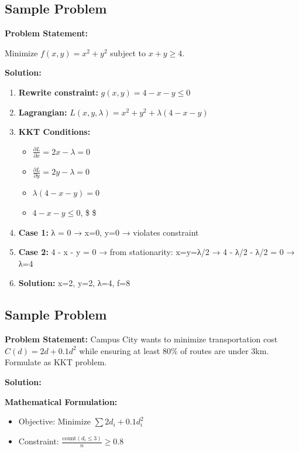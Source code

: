 \documentclass[
  letterpaper,
  DIV=11,
  numbers=noendperiod]{scrreprt}
\providecommand{\tightlist}{%
  \setlength{\itemsep}{0pt}\setlength{\parskip}{0pt}}
\begin{document}
\subsection{Sample Problem}\label{sample-problem-4}

\textbf{Problem Statement:}

Minimize \(f(x,y) = x^2 + y^2\) subject to \(x + y \geq 4\).

\textbf{Solution:}

\begin{enumerate}
\def\labelenumi{\arabic{enumi}.}
\tightlist
\item
  \textbf{Rewrite constraint:} \(g(x,y) = 4 - x - y \leq 0\)
\item
  \textbf{Lagrangian:}
  \(L(x,y,\lambda) = x^2 + y^2 + \lambda(4 - x - y)\)
\item
  \textbf{KKT Conditions:}

  \begin{itemize}
  \tightlist
  \item
    \(\frac{\partial L}{\partial x} = 2x - \lambda = 0\)
  \item
    \(\frac{\partial L}{\partial y} = 2y - \lambda = 0\)
  \item
    \(\lambda(4 - x - y) = 0\)
  \item
    \(4 - x - y \leq 0\), \$\lambda {} \$
  \end{itemize}
\item
  \textbf{Case 1:} λ = 0 → x=0, y=0 → violates constraint
\item
  \textbf{Case 2:} 4 - x - y = 0 → from stationarity: x=y=λ/2 → 4 - λ/2
  - λ/2 = 0 → λ=4
\item
  \textbf{Solution:} x=2, y=2, λ=4, f=8
\end{enumerate}

\subsection{Sample Problem}\label{sample-problem-5}

\textbf{Problem Statement:} Campus City wants to minimize transportation
cost \(C(d) = 2d + 0.1d^2\) while ensuring at least 80\% of routes are
under 3km. Formulate as KKT problem.

\textbf{Solution:}

\textbf{Mathematical Formulation:}

\begin{itemize}
\tightlist
\item
  Objective: Minimize \(\sum 2d_i + 0.1d_i^2\)
\item
  Constraint: \(\frac{\text{count}(d_i \leq 3)}{n} \geq 0.8\)
\end{itemize}
\end{document}
